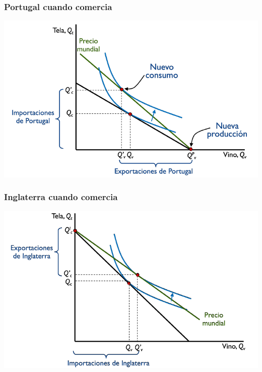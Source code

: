 \documentclass{beamer}
\begin{document}

\begin{frame}
\frametitle{Portugal cuando comercia}
\centering
\includegraphics[scale=0.6]{../Figures/Tema_03_5_portugal3.png}
\end{frame}

\begin{frame}
\frametitle{Inglaterra cuando comercia}
\centering
\includegraphics[scale=0.6]{../Figures/Tema_03_6_inglaterra3.png}
\end{frame}
\end{document}
